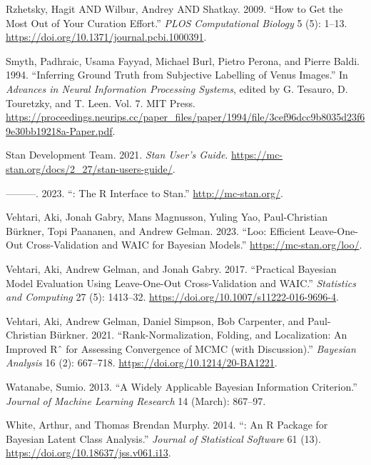 \begin{CSLReferences}{1}{0}
\leavevmode{}%
Rzhetsky, Hagit AND Wilbur, Andrey AND Shatkay. 2009. {``How to Get the Most Out of Your Curation Effort.''} \emph{PLOS Computational Biology} 5 (5): 1--13. \url{https://doi.org/10.1371/journal.pcbi.1000391}.

\leavevmode{}%
Smyth, Padhraic, Usama Fayyad, Michael Burl, Pietro Perona, and Pierre Baldi. 1994. {``Inferring Ground Truth from Subjective Labelling of {V}enus Images.''} In \emph{Advances in Neural Information Processing Systems}, edited by G. Tesauro, D. Touretzky, and T. Leen. Vol. 7. MIT Press. \url{https://proceedings.neurips.cc/paper_files/paper/1994/file/3cef96dcc9b8035d23f69e30bb19218a-Paper.pdf}.

\leavevmode{}%
Stan Development Team. 2021. \emph{Stan {U}ser's {G}uide}. \url{https://mc-stan.org/docs/2_27/stan-users-guide/}.

\leavevmode{}%
---------. 2023. {``: The {R} Interface to {Stan}.''} \url{http://mc-stan.org/}.

\leavevmode{}%
Vehtari, Aki, Jonah Gabry, Mans Magnusson, Yuling Yao, Paul-Christian Bürkner, Topi Paananen, and Andrew Gelman. 2023. {``Loo: Efficient Leave-One-Out Cross-Validation and WAIC for {B}ayesian Models.''} \url{https://mc-stan.org/loo/}.

\leavevmode{}%
Vehtari, Aki, Andrew Gelman, and Jonah Gabry. 2017. {``Practical {Bayesian} Model Evaluation Using Leave-One-Out Cross-Validation and {WAIC}.''} \emph{Statistics and Computing} 27 (5): 1413--32. \url{https://doi.org/10.1007/s11222-016-9696-4}.

\leavevmode{}%
Vehtari, Aki, Andrew Gelman, Daniel Simpson, Bob Carpenter, and Paul-Christian Bürkner. 2021. {``Rank-{Normalization}, {Folding}, and {Localization}: {An} {Improved} {Rˆ} for {Assessing} {Convergence} of {MCMC} (with {Discussion}).''} \emph{Bayesian Analysis} 16 (2): 667--718. \url{https://doi.org/10.1214/20-BA1221}.

\leavevmode{}%
Watanabe, Sumio. 2013. {``A {Widely Applicable Bayesian Information Criterion}.''} \emph{Journal of Machine Learning Research} 14 (March): 867--97.

\leavevmode{}%
White, Arthur, and Thomas Brendan Murphy. 2014. {``: {An} {R} {Package} for {Bayesian} {Latent} {Class} {Analysis}.''} \emph{Journal of Statistical Software} 61 (13). \url{https://doi.org/10.18637/jss.v061.i13}.


\end{CSLReferences}
